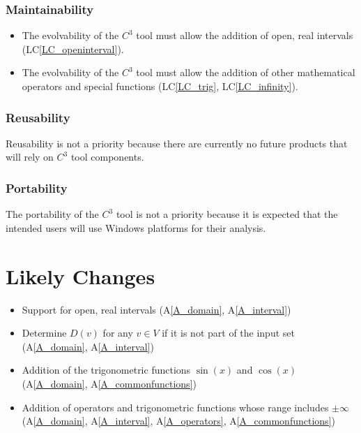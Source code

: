\documentclass[12pt]{article}
\newcommand{\aref}[1]{A\ref{#1}}
\newcounter{lcnum} %
\newcommand{\lcref}[1]{LC\ref{#1}}
\newcommand{\prognameAbbrv}{$C^{3}$}
\begin{document}
\subsubsection*{Maintainability}
\begin{itemize}
	\item The evolvability of the \prognameAbbrv{} tool must allow the addition 
	of open, real intervals (\lcref{LC_openinterval}).
	\item The evolvability of the \prognameAbbrv{} tool must allow the addition 
	of other mathematical operators and special functions (\lcref{LC_trig}, 
	\lcref{LC_infinity}).
\end{itemize}

\subsubsection*{Reusability}
Reusability is not a priority because there are currently no future products 
that will rely on \prognameAbbrv{} tool components.

\subsubsection*{Portability}
The portability of the \prognameAbbrv{} tool is not a priority because it is 
expected that the intended users will use Windows platforms for their analysis.

\newpage

\section{Likely Changes}    
\label{changes}

\noindent \begin{itemize}

\item[LC\refstepcounter{lcnum}\thelcnum\label{LC_openinterval}:] Support for 
open, real intervals (\aref{A_domain}, \aref{A_interval})

\item[LC\refstepcounter{lcnum}\thelcnum\label{LC_unknownDomain}:] Determine 
$D(v)$ for any $v \in V$ if it is not part of the input set (\aref{A_domain}, 
\aref{A_interval})

\item[LC\refstepcounter{lcnum}\thelcnum\label{LC_trig}:] Addition of the 
trigonometric functions $\sin(x)$ and $\cos(x)$ (\aref{A_domain}, 
\aref{A_commonfunctions})

\item[LC\refstepcounter{lcnum}\thelcnum\label{LC_infinity}:] Addition of 
operators and trigonometric functions whose range includes $\pm\infty$ 
(\aref{A_domain}, \aref{A_interval}, \aref{A_operators}, 
\aref{A_commonfunctions})

\end{itemize}
\end{document}
